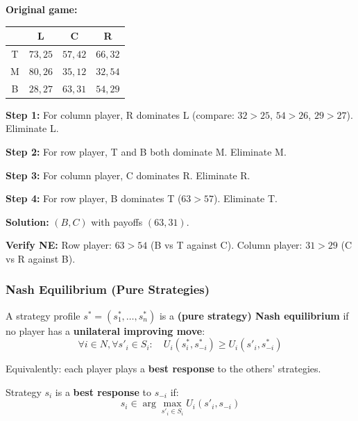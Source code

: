 \begin{exbox}
\textbf{Original game:}
\begin{center}
\renewcommand{\arraystretch}{1.2}
\begin{tabular}{@{} c | c c c @{}}
 & L & C & R \\
\midrule
T & $73, 25$ & $57, 42$ & $66, 32$ \\
M & $80, 26$ & $35, 12$ & $32, 54$ \\
B & $28, 27$ & $63, 31$ & $54, 29$ \\
\end{tabular}
\end{center}

\textbf{Step 1:} For column player, R dominates L (compare: $32 > 25$, $54 > 26$, $29 > 27$). Eliminate L.

\textbf{Step 2:} For row player, T and B both dominate M. Eliminate M.

\textbf{Step 3:} For column player, C dominates R. Eliminate R.

\textbf{Step 4:} For row player, B dominates T ($63 > 57$). Eliminate T.

\textbf{Solution:} $(B, C)$ with payoffs $(63, 31)$.

\textbf{Verify NE:} Row player: $63 > 54$ (B vs T against C). Column player: $31 > 29$ (C vs R against B). \checkmark
\end{exbox}

\bigseparator

\subsubsection{Nash Equilibrium (Pure Strategies)}

\begin{defbox}
A strategy profile $s^* = (s^*_1, \ldots, s^*_n)$ is a \textbf{(pure strategy) Nash equilibrium} if no player has a \textbf{unilateral improving move}:
\[
\forall i \in N, \forall s'_i \in S_i: \quad U_i(s^*_i, s^*_{-i}) \geq U_i(s'_i, s^*_{-i})
\]

Equivalently: each player plays a \textbf{best response} to the others' strategies.
\end{defbox}

\begin{defbox}
Strategy $s_i$ is a \textbf{best response} to $s_{-i}$ if:
\[
s_i \in \arg\max_{s'_i \in S_i} U_i(s'_i, s_{-i})
\]
\end{defbox}

